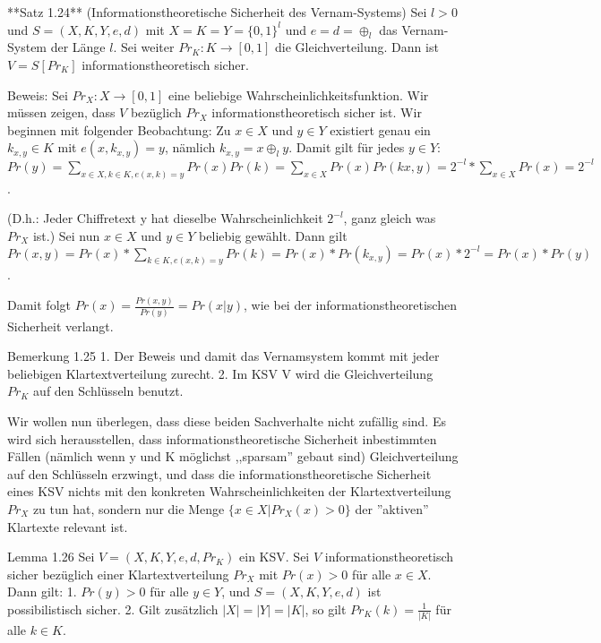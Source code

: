 \documentclass[a4paper]{article}
\begin{document}
\begin{multicols}{3}
    **Satz 1.24** (Informationstheoretische Sicherheit des Vernam-Systems) Sei $l>0$ und $S=(X,K,Y,e,d)$ mit $X=K=Y=\{0,1\}^l$ und $e=d=\oplus_l$ das Vernam-System der Länge $l$. Sei weiter $Pr_K:K\rightarrow [0,1]$ die Gleichverteilung. Dann ist $V=S[Pr_K]$ informationstheoretisch sicher.

    Beweis: Sei $Pr_X:X\rightarrow [0,1]$ eine beliebige Wahrscheinlichkeitsfunktion. Wir müssen zeigen, dass $V$ bezüglich $Pr_X$ informationstheoretisch sicher ist. Wir beginnen mit folgender Beobachtung: Zu $x\in X$ und $y\in Y$  existiert genau ein $k_{x,y}\in K$ mit $e(x,k_{x,y})=y$, nämlich $k_{x,y}=x\oplus_l y$. Damit gilt für jedes $y\in Y$: $Pr(y)=\sum_{x\in X,k\in K,e(x,k)=y} Pr(x)Pr(k) = \sum_{x\in X} Pr(x) Pr(kx,y)= 2^{-l}* \sum_{x\in X} Pr(x)=2^{-l}$.

    (D.h.: Jeder Chiffretext y hat dieselbe Wahrscheinlichkeit $2^{-l}$, ganz gleich was $Pr_X$ ist.)
    Sei nun $x\in X$ und $y\in Y$ beliebig gewählt. Dann gilt $Pr(x,y) = Pr(x)*\sum_{k\in K, e(x,k)=y} Pr(k) = Pr(x)*Pr(k_{x,y}) = Pr(x)* 2^{-l}= Pr(x)*Pr(y)$.

    Damit folgt $Pr(x)=\frac{Pr(x,y)}{Pr(y)}= Pr(x|y)$, wie bei der informationstheoretischen Sicherheit verlangt.

    Bemerkung 1.25
    1. Der Beweis und damit das Vernamsystem kommt mit jeder beliebigen Klartextverteilung zurecht.
    2. Im KSV V wird die Gleichverteilung $Pr_K$ auf den Schlüsseln benutzt.

    Wir wollen nun überlegen, dass diese beiden Sachverhalte nicht zufällig sind.  Es wird sich herausstellen, dass informationstheoretische Sicherheit inbestimmten  Fällen (nämlich wenn y und K möglichst ,,sparsam'' gebaut sind) Gleichverteilung auf den Schlüsseln erzwingt, und dass die informationstheoretische Sicherheit eines KSV nichts mit den konkreten Wahrscheinlichkeiten der Klartextverteilung $Pr_X$ zu tun hat, sondern nur die Menge $\{x\in X|Pr_X(x)> 0\}$ der ''aktiven'' Klartexte relevant ist.

    Lemma 1.26 Sei $V=(X,K,Y,e,d,Pr_K)$ ein KSV. Sei $V$ informationstheoretisch sicher bezüglich einer Klartextverteilung $Pr_X$ mit $Pr(x)>0$ für alle $x\in X$. Dann gilt:
    1. $Pr(y)>0$ für alle $y\in Y$, und $S=(X,K,Y,e,d)$ ist possibilistisch sicher.
    2. Gilt zusätzlich $|X|=|Y|=|K|$, so gilt $Pr_K(k)=\frac{1}{|K|}$ für alle $k\in K$.


\end{multicols}
\end{document}
